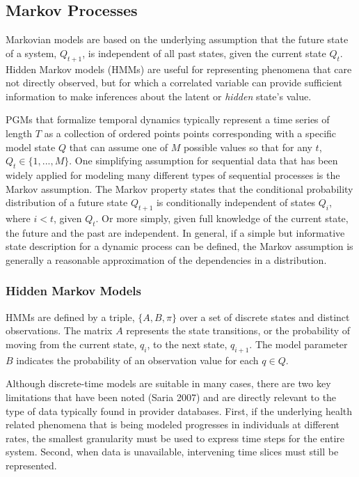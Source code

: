 \subsection{Markov Processes}
Markovian models are based on the underlying assumption that the future state of a system, $Q_{t+1}$, is independent of all past states, given the current state $Q_{t}$.  Hidden Markov models (HMMs) are useful for representing phenomena that care not directly observed, but for which a correlated variable can provide sufficient information to make inferences about the latent or \emph{hidden} state's value.

PGMs that formalize temporal dynamics typically represent a time series of length $T$ as a collection of ordered points points corresponding with a specific model state $Q$ that can assume one of $M$ possible values so that for any $t$, $Q_{t} \in \{1,...,M\}$.  One simplifying assumption for sequential data that has been widely applied for modeling many different types of sequential processes is the Markov assumption.  The Markov property states that the conditional probability distribution of a future state $Q_{t+1}$ is conditionally independent of states $Q_{i}$, where $i<t$, given $Q_{t}$.  Or more simply, given full knowledge of the current state, the future and the past are independent.  In general, if a simple but informative state description for a dynamic process can be defined, the Markov assumption is generally a reasonable approximation of the dependencies in a distribution.

\subsubsection{Hidden Markov Models}
HMMs are defined by a triple, $\{ A, B, \pi \}$ over a set of discrete states and distinct observations.  The matrix $A$ represents the state transitions, or the probability of moving from the current state, $q_{i}$, to the next state, $q_{i+1}$. The model parameter $B$ indicates the probability of an observation value for each $q\in Q$.

Although discrete-time models are suitable in many cases, there are two key limitations that have been noted (Saria 2007) and are directly relevant to the type of data typically found in provider databases.  First, if the underlying health related phenomena that is being modeled progresses in individuals at different rates, the smallest granularity must be used to express time steps for the entire system.  Second, when data is unavailable, intervening time slices must still be represented.


